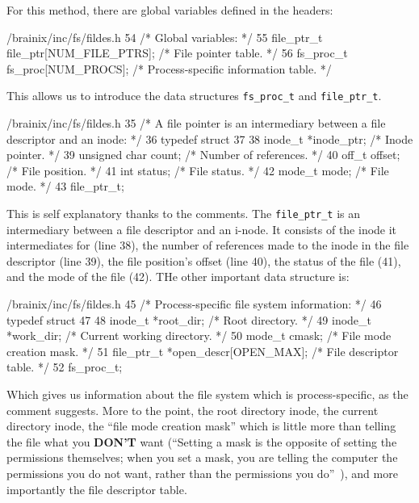 \documentclass{article}
\begin{document}
For this method, there are global variables defined in the headers:
\begin{code}{/brainix/inc/fs/fildes.h}
54 /* Global variables: */
55 file_ptr_t file_ptr[NUM_FILE_PTRS]; /* File pointer table.                 */
56 fs_proc_t fs_proc[NUM_PROCS];       /* Process-specific information table. */
\end{code}
This allows us to introduce the data structures \verb|fs_proc_t| and \verb|file_ptr_t|.
\begin{code}{/brainix/inc/fs/fildes.h}
35 /* A file pointer is an intermediary between a file descriptor and an inode: */
36 typedef struct
37 {
38      inode_t *inode_ptr;  /* Inode pointer.        */
39      unsigned char count; /* Number of references. */
40      off_t offset;        /* File position.        */
41      int status;          /* File status.          */
42      mode_t mode;         /* File mode.            */
43 } file_ptr_t;
\end{code}
This is self explanatory thanks to the comments. The \verb|file_ptr_t| is an intermediary between a file descriptor and an i-node. It consists of the inode it intermediates for (line 38), the number of references made to the inode in the file descriptor (line 39), the file position's offset (line 40), the status of the file (41), and the mode of the file (42). THe other important data structure is:
\begin{code}{/brainix/inc/fs/fildes.h}
45 /* Process-specific file system information: */
46 typedef struct
47 {
48      inode_t *root_dir;                /* Root directory.            */
49      inode_t *work_dir;                /* Current working directory. */
50      mode_t cmask;                     /* File mode creation mask.   */
51      file_ptr_t *open_descr[OPEN_MAX]; /* File descriptor table.     */
52 } fs_proc_t;
\end{code}
Which gives us information about the file system which is process-specific, as the comment suggests. More to the point, the root directory inode, the current directory inode, the ``file mode creation mask'' which is little more than telling the file what you \textbf{DON'T} want (``Setting a mask is the opposite of setting the permissions themselves; when you set a mask, you are telling the computer the permissions you do not want, rather than the permissions you do''~\cite{9}), and more importantly the file descriptor table.
\end{document}
